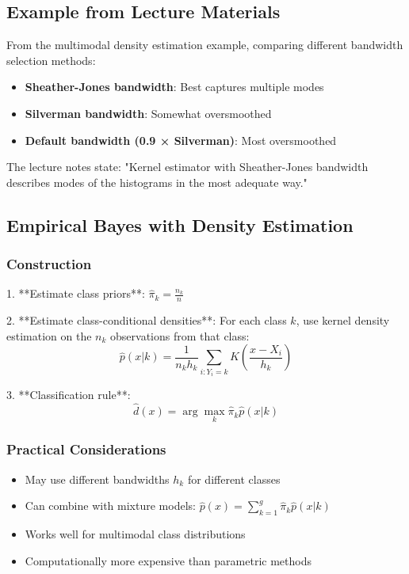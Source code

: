 \documentclass[12pt,a4paper]{article}
\begin{document}
\subsection{Example from Lecture Materials}

From the multimodal density estimation example, comparing different bandwidth selection methods:

\begin{itemize}
    \item \textbf{Sheather-Jones bandwidth}: Best captures multiple modes
    \item \textbf{Silverman bandwidth}: Somewhat oversmoothed
    \item \textbf{Default bandwidth (0.9 × Silverman)}: Most oversmoothed
\end{itemize}

The lecture notes state: "Kernel estimator with Sheather-Jones bandwidth describes modes of the histograms in the most adequate way."

\subsection{Empirical Bayes with Density Estimation}

\subsubsection{Construction}

1. **Estimate class priors**: $\hat{\pi}_k = \frac{n_k}{n}$

2. **Estimate class-conditional densities**: For each class $k$, use kernel density estimation on the $n_k$ observations from that class:
   \begin{equation}
   \hat{p}(x|k) = \frac{1}{n_k h_k} \sum_{i: Y_i = k} K\left(\frac{x - X_i}{h_k}\right)
   \end{equation}

3. **Classification rule**:
   \begin{equation}
   \hat{d}(x) = \arg\max_k \hat{\pi}_k \hat{p}(x|k)
   \end{equation}

\subsubsection{Practical Considerations}

\begin{itemize}
    \item May use different bandwidths $h_k$ for different classes
    \item Can combine with mixture models: $\hat{p}(x) = \sum_{k=1}^g \hat{\pi}_k \hat{p}(x|k)$
    \item Works well for multimodal class distributions
    \item Computationally more expensive than parametric methods
\end{itemize}
\end{document}
